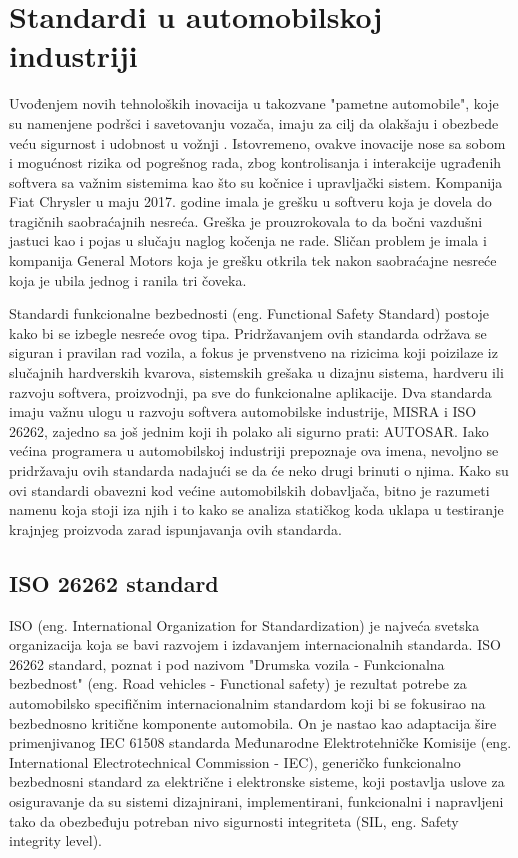 \documentclass[a4paper]{article}
\begin{document}
\section{Standardi u automobilskoj industriji}
\label{sec:naslov1}

Uvođenjem novih tehnoloških inovacija u takozvane "pametne automobile", koje su namenjene podršci i savetovanju vozača, imaju za cilj da olakšaju i obezbede veću sigurnost i udobnost u vožnji \cite{ref36}.
Istovremeno, ovakve inovacije nose sa sobom i mogućnost rizika od pogrešnog rada, zbog kontrolisanja i interakcije ugrađenih softvera sa važnim sistemima kao što su kočnice i upravljački sistem. Kompanija Fiat Chrysler u maju 2017. godine imala je grešku u softveru koja je dovela do tragičnih saobraćajnih nesreća. Greška je prouzrokovala to da bočni vazdušni jastuci kao i pojas u slučaju naglog kočenja ne rade. Sličan problem je imala i kompanija General Motors koja je grešku otkrila tek nakon saobraćajne nesreće koja je ubila jednog i ranila tri čoveka. 

Standardi funkcionalne bezbednosti (eng. Functional Safety Standard) postoje kako bi se izbegle nesreće ovog tipa. Pridržavanjem ovih standarda održava se siguran i pravilan rad vozila, a fokus je prvenstveno na rizicima koji poizilaze iz slučajnih hardverskih kvarova, sistemskih grešaka u dizajnu sistema, hardveru ili razvoju softvera, proizvodnji, pa sve do funkcionalne aplikacije. Dva standarda imaju važnu ulogu u razvoju softvera automobilske industrije, MISRA i ISO 26262, zajedno sa još jednim koji ih polako ali sigurno prati: AUTOSAR. Iako većina programera u automobilskoj industriji prepoznaje ova imena, nevoljno se pridržavaju ovih standarda nadajući se da će neko drugi brinuti o njima. Kako su ovi standardi obavezni kod većine automobilskih dobavljača, bitno je razumeti namenu koja stoji iza njih i to kako se analiza statičkog koda uklapa u testiranje krajnjeg proizvoda zarad ispunjavanja ovih standarda.
\bigbreak

\subsection{ISO 26262 standard}
\label{subsec:podnaslov1}

ISO (eng. International Organization for Standardization) je najveća svetska organizacija koja se bavi razvojem i izdavanjem internacionalnih standarda. ISO 26262 standard, poznat i pod nazivom "Drumska vozila - Funkcionalna bezbednost" (eng. Road vehicles - Functional safety) je rezultat potrebe za automobilsko specifičnim internacionalnim standardom koji bi se fokusirao na bezbednosno kritične komponente automobila. On je nastao kao adaptacija šire primenjivanog IEC 61508 standarda Međunarodne Elektrotehničke Komisije (eng. International Electrotechnical Commission - IEC), generičko funkcionalno bezbednosni standard za električne i elektronske sisteme, koji postavlja uslove za osiguravanje da su sistemi dizajnirani, implementirani, funkcionalni i napravljeni tako da obezbeđuju potreban nivo sigurnosti integriteta (SIL, eng. Safety integrity level). 
\bigbreak
\end{document}
